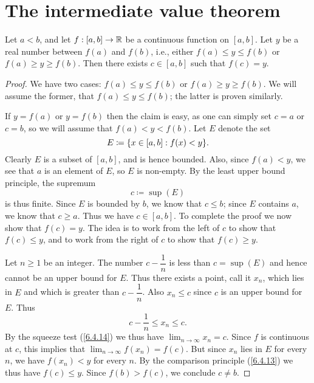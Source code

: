 \section{The intermediate value theorem}\label{sec:9.7}

\begin{thm}\label{9.7.1}
  Let \(a < b\), and let \(f : [a, b] \to \mathbb{R}\) be a continuous function on \([a, b]\).
  Let \(y\) be a real number between \(f(a)\) and \(f(b)\), i.e., either \(f(a) \leq y \leq f(b)\) or \(f(a) \geq y \geq f(b)\).
  Then there exists \(c \in [a, b]\) such that \(f(c) = y\).
\end{thm}

\begin{proof}
  We have two cases: \(f(a) \leq y \leq f(b)\) or \(f(a) \geq y \geq f(b)\).
  We will assume the former, that \(f(a) \leq y \leq f(b)\);
  the latter is proven similarly.

  If \(y = f(a)\) or \(y = f(b)\) then the claim is easy, as one can simply set \(c = a\) or \(c = b\), so we will assume that \(f(a) < y < f(b)\).
  Let \(E\) denote the set
  \[
    E \coloneqq \set{x \in [a, b] : f(x) < y}.
  \]
  Clearly \(E\) is a subset of \([a, b]\), and is hence bounded.
  Also, since \(f(a) < y\), we see that \(a\) is an element of \(E\), so \(E\) is non-empty.
  By the least upper bound principle, the supremum
  \[
    c \coloneqq \sup(E)
  \]
  is thus finite.
  Since \(E\) is bounded by \(b\), we know that \(c \leq b\);
  since \(E\) contains \(a\), we know that \(c \geq a\).
  Thus we have \(c \in [a, b]\).
  To complete the proof we now show that \(f(c) = y\).
  The idea is to work from the left of \(c\) to show that \(f(c) \leq y\), and to work from the right of \(c\) to show that \(f(c) \geq y\).

  Let \(n \geq 1\) be an integer.
  The number \(c - \dfrac{1}{n}\) is less than \(c = \sup(E)\) and hence cannot be an upper bound for \(E\).
  Thus there exists a point, call it \(x_n\), which lies in \(E\) and which is greater than \(c - \dfrac{1}{n}\).
  Also \(x_n \leq c\) since \(c\) is an upper bound for \(E\).
  Thus
  \[
    c - \dfrac{1}{n} \leq x_n \leq c.
  \]
  By the squeeze test (\cref{6.4.14}) we thus have \(\lim_{n \to \infty} x_n = c\).
  Since \(f\) is continuous at \(c\), this implies that \(\lim_{n \to \infty} f(x_n) = f(c)\).
  But since \(x_n\) lies in \(E\) for every \(n\), we have \(f(x_n) < y\) for every \(n\).
  By the comparison principle (\cref{6.4.13}) we thus have \(f(c) \leq y\).
  Since \(f(b) > f(c)\), we conclude \(c \neq b\).


\end{proof}
